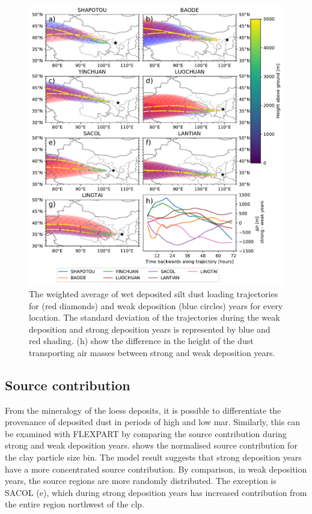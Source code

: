 \begin{figure}[htbp]
    \centering
    \includegraphics[width=\textwidth]{texfiles/figs/20_micron_wetdep_weak_strong_trajecs.pdf}
    \caption{The weighted average of wet deposited silt dust loading trajectories for (red diamonds) and weak deposition (blue circles) years for every location. The standard deviation of the trajectories during the weak deposition and strong deposition years is represented by blue and red shading.  (h) show the difference in the height of the dust transporting air masses between strong and weak deposition years. }
    \label{fig:strong_weak_wetdepo_year_20mmu_trajecs}
\end{figure}

\subsection{Source contribution}
From the mineralogy of the loess deposits, it is possible to differentiate the provenance of deposited dust in periods of high and low \acrshort{mar}. Similarly, this can be examined with FLEXPART by comparing the source contribution during strong and weak deposition years.  
 shows the normalised source contribution for the clay particle size bin. The model result suggests that strong deposition years have a more concentrated source contribution. By comparison, in weak deposition years, the source regions are more randomly distributed. 
The exception is SACOL (e), which during strong deposition years has increased contribution from the entire region northwest of the \acrshort{clp}. 

